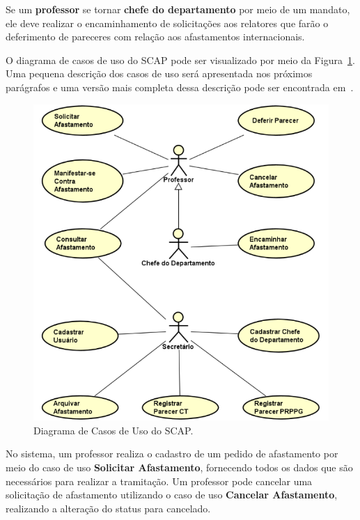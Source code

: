 Se um \textbf{professor} se tornar \textbf{chefe do departamento} por meio de um mandato, ele deve realizar o encaminhamento de solicitações aos relatores que farão o deferimento de pareceres com relação aos afastamentos internacionais.

O diagrama de casos de uso do SCAP pode ser visualizado por meio da Figura~\ref{fig-requisitos-casos-uso}. Uma pequena descrição dos casos de uso será apresentada nos próximos parágrafos e uma versão mais completa dessa descrição pode ser encontrada em~\cite{duarte-pg14,prado-pg15}.
     
\begin{figure}[h]
	\centering
	\includegraphics[scale=0.5]{figuras/fig-requisitos-casos-uso} 
	\caption{Diagrama de Casos de Uso do SCAP.}
	\label{fig-requisitos-casos-uso}
\end{figure}

No sistema, um professor realiza o cadastro de um pedido de afastamento por meio do caso de uso \textbf{Solicitar Afastamento}, fornecendo todos os dados que são necessários para realizar a tramitação. Um professor pode cancelar uma solicitação de afastamento utilizando o caso de uso \textbf{Cancelar Afastamento}, realizando a alteração do status para cancelado.

